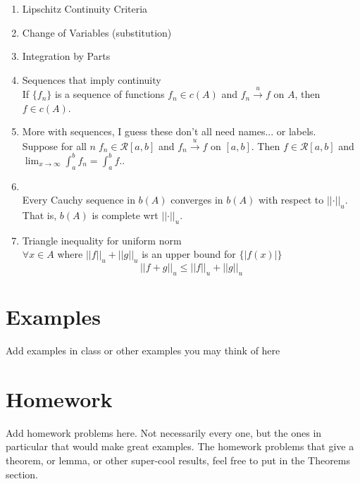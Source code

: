 \documentclass{article}
\newcommand{\norm}[1]{\left|\left|#1\right|\right|}
\newcommand{\scriptR}{\mathcal{R}}
\begin{document}
\begin{enumerate}
\item Lipschitz Continuity Criteria\label{LipschitzCont}\hfill \\

    \item Change of Variables (substitution)\label{usub}\hfill \\

    \item Integration by Parts\label{intbyparts}\hfill \\

    \item Sequences that imply continuity\label{seqimpc}\hfill \\
        If \(\{f_n\}\) is a sequence of functions \(f_n\in c(A)\) and \(f_n\stackrel{u}{\to} f\) on \(A\), then \(f\in c(A)\).

    \item More with sequences,  I guess these don't all need names... or labels.\hfill \\
        Suppose for all \(n\; f_n\in\scriptR[a,b]\) and \(f_n\stackrel{u}{\to} f\) on \([a,b]\).  Then \(f\in\scriptR[a,b]\) and \(\displaystyle{\lim_{x\to\infty}\int_a^bf_n = \int_a^b f.}\).

    \item \hfill \\
        Every Cauchy sequence in \(b(A)\) converges in \(b(A)\) with respect to \(\norm{\cdot}_u\).  
        That is, \(b(A)\) is complete wrt \(\norm{\cdot}_u.\)
        
      \item Triangle inequality for uniform norm\label{triinequality}\hfill \\
      $\forall x\in A$ where $||f||_u+||g||_u$ is an upper bound for $\{|f(x)|\}$ $$||f+g||_u\leq ||f||_u+||g||_u$$

\end{enumerate}




\section{Examples}
Add examples in class or other examples you may think of here

\section{Homework}
Add homework problems here.  Not necessarily every one, but the ones in particular that would make great examples.
The homework problems that give a theorem, or lemma, or other super-cool results, feel free to put in the Theorems section.
\end{document}
